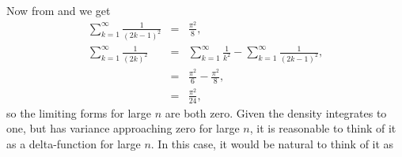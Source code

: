 Now from \cite[0.234,2.(p.7)]{GandR} and \cite[0.233,3.(p.7)]{GandR}  we get
\begin{eqnarray}
  \sum_{k=1}^{\infty} \frac{1}{(2k-1)^2} & = & \frac{\pi^2}{8},  \\
  \sum_{k=1}^{\infty} \frac{1}{(2k)^2}
           & = &  \sum_{k=1}^{\infty} \frac{1}{k^2} - \sum_{k=1}^{\infty} \frac{1}{(2k-1)^2}, \nonumber \\
           & = & \frac{\pi^2}{6}  - \frac{\pi^2}{8}  , \nonumber \\
           & = & \frac{\pi^2}{24} ,
\end{eqnarray}
so the limiting forms for large $n$ are both zero. Given the density
integrates to one, but has variance approaching zero for large $n$, it
is reasonable to think of it as a delta-function for large $n$. In
this case, it would be natural to think of it as 

%   

